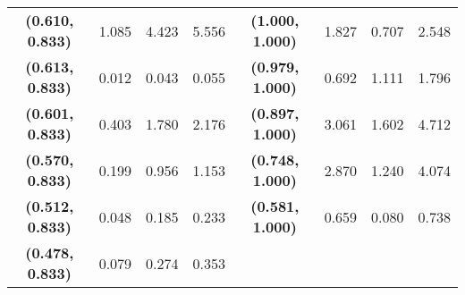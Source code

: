 \begin{table}[h]
{\begin{tabular}{@{}clllc|lll@{}}
\textbf{(0.610, 0.833)}   & 1.085                 & 4.423                   & 5.556                   & \textbf{(1.000, 1.000)}   & 1.827                 & 0.707                   & 2.548                   \\
\textbf{(0.613, 0.833)}   & 0.012                 & 0.043                   & 0.055                   & \textbf{(0.979, 1.000)}   & 0.692                 & 1.111                   & 1.796                   \\
\textbf{(0.601, 0.833)}   & 0.403                 & 1.780                   & 2.176                   & \textbf{(0.897, 1.000)}   & 3.061                 & 1.602                   & 4.712                   \\
\textbf{(0.570, 0.833)}   & 0.199                 & 0.956                   & 1.153                   & \textbf{(0.748, 1.000)}   & 2.870                 & 1.240                   & 4.074                   \\
\textbf{(0.512, 0.833)}   & 0.048                 & 0.185                   & 0.233                   & \textbf{(0.581, 1.000)}   & 0.659                 & 0.080                   & 0.738                   \\
\textbf{(0.478, 0.833)}   & 0.079                 & 0.274                   & 0.353                   & \textbf{}                 &                       &                         &                         \\ \bottomrule
\end{tabular}%
}
\end{table}
